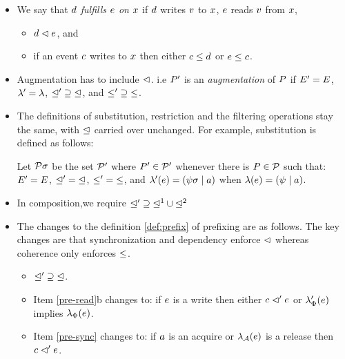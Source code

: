 \begin{itemize}
\item
  We say that $d$ \emph{fulfills $e$ on $x$} if $d$ writes
  $v$ to $x$, $e$ reads $v$ from $x$,
  \begin{itemize}
  \item $d \vartriangleleft e$, and
  \item if an event $c$ writes to $x$ then either $c \leq d$ or $e \leq c$.
  \end{itemize}

\item 
Augmentation has to include ${\vartriangleleft}$. i.e 
$P'$ is an \emph{augmentation} of $P$ if $E'=E$,
  ${\lambda'}={\lambda}$, ${\trianglelefteq'}\supseteq{\trianglelefteq}$, and
  ${\leq'}\supseteq{\leq}$.

\item The definitions of substitution, restriction and the filtering
  operations  stay the same, with $\trianglelefteq$ carried over unchanged.  For
  example, substitution is defined as follows:

Let $\mathcal{P}\sigma$ be the set $\mathcal{P}'$ where $P'\in\mathcal{P}'$ whenever
there is $P\in\mathcal{P}$ such that:
$E' = E$,
${\trianglelefteq'} = {\trianglelefteq}$, 
${\leq'} = {\leq}$,
and
$\lambda'(e) = (\psi\sigma \mid a)$ when $\lambda(e) = (\psi \mid a)$.


\item In composition,we require ${\trianglelefteq'}\supseteq{\trianglelefteq^1}\cup{\trianglelefteq^2}$

\item The changes to the definition \ref{def:prefix} of prefixing are as follows.  The key changes are that synchronization and dependency enforce $\vartriangleleft$ whereas coherence only enforces $\leq$. 
\begin{itemize}
\item ${\trianglelefteq'}\supseteq{\trianglelefteq}$.

\item Item \ref{pre-read}b changes to: if $e$ is a write then either $c\vartriangleleft'e$
    or $\lambda_{\Phi}'(e)$ implies $\lambda_{\Phi}(e)$.


\item Item \ref{pre-sync} changes to: if $a$ is an acquire or $\lambda_{\mathcal{A}}(e)$ is a release then $c \vartriangleleft' e$.
\end{itemize}
\end{itemize}

